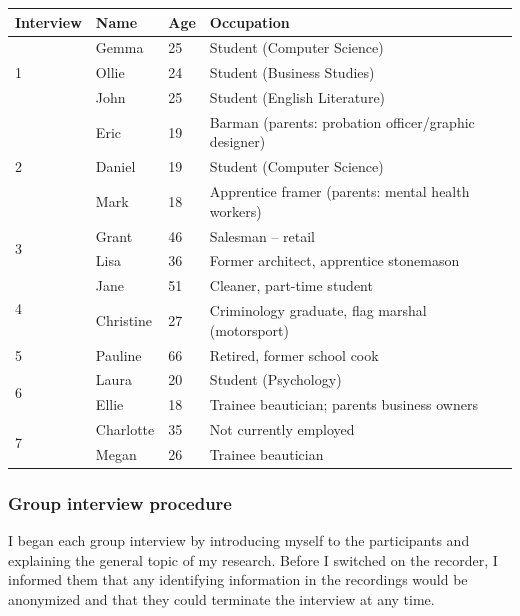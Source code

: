 \documentclass{article}
\begin{document}
\begin{table}[!ht]
\begin{tabular}{|l|l|l|l|}
\hline
Interview          & Name      & Age & Occupation                                           \\ \hline
\multirow{3}{*}{1} & Gemma     & 25  & Student (Computer Science)                           \\ \cline{2-4} 
                   & Ollie     & 24  & Student (Business Studies)                           \\ \cline{2-4} 
                   & John      & 25  & Student (English Literature)                         \\ \hline
\multirow{3}{*}{2} & Eric      & 19  & Barman (parents: probation officer/graphic designer) \\ \cline{2-4} 
                   & Daniel    & 19  & Student (Computer Science)                           \\ \cline{2-4} 
                   & Mark      & 18  & Apprentice framer (parents: mental health workers)   \\ \hline
\multirow{2}{*}{3} & Grant     & 46  & Salesman -- retail                                   \\ \cline{2-4} 
                   & Lisa      & 36  & Former architect, apprentice stonemason              \\ \hline
\multirow{2}{*}{4} & Jane      & 51  & Cleaner, part-time student                           \\ \cline{2-4} 
                   & Christine & 27  & Criminology graduate, flag marshal (motorsport)      \\ \hline
5                  & Pauline   & 66  & Retired, former school cook                          \\ \hline
\multirow{2}{*}{6} & Laura     & 20  & Student (Psychology)                                 \\ \cline{2-4} 
                   & Ellie     & 18  & Trainee beautician; parents business owners          \\ \hline
\multirow{2}{*}{7} & Charlotte & 35  & Not currently employed                               \\ \cline{2-4} 
                   & Megan     & 26  & Trainee beautician                                   \\ \hline
\end{tabular}
\end{table}
\newpage
\subsubsection*{Group interview procedure}
I began each group interview by introducing myself to the participants and explaining the general topic of my research. Before I switched on the recorder, I informed them that any identifying information in the recordings would be anonymized and that they could terminate the interview at any time. 
\end{document}
